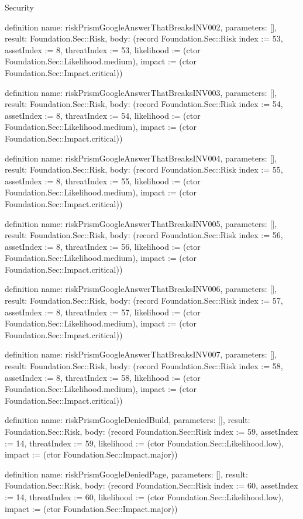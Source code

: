\begin{lexlean}{Security}
\begin{semanticmodule}
definition{
  name: riskPrismGoogleAnswerThatBreaksINV002,
  parameters: [],
  result: Foundation.Sec::Risk,
  body: (record Foundation.Sec::Risk {index := 53, assetIndex := 8, threatIndex := 53, likelihood := (ctor Foundation.Sec::Likelihood.medium), impact := (ctor Foundation.Sec::Impact.critical)})
}

definition{
  name: riskPrismGoogleAnswerThatBreaksINV003,
  parameters: [],
  result: Foundation.Sec::Risk,
  body: (record Foundation.Sec::Risk {index := 54, assetIndex := 8, threatIndex := 54, likelihood := (ctor Foundation.Sec::Likelihood.medium), impact := (ctor Foundation.Sec::Impact.critical)})
}

definition{
  name: riskPrismGoogleAnswerThatBreaksINV004,
  parameters: [],
  result: Foundation.Sec::Risk,
  body: (record Foundation.Sec::Risk {index := 55, assetIndex := 8, threatIndex := 55, likelihood := (ctor Foundation.Sec::Likelihood.medium), impact := (ctor Foundation.Sec::Impact.critical)})
}

definition{
  name: riskPrismGoogleAnswerThatBreaksINV005,
  parameters: [],
  result: Foundation.Sec::Risk,
  body: (record Foundation.Sec::Risk {index := 56, assetIndex := 8, threatIndex := 56, likelihood := (ctor Foundation.Sec::Likelihood.medium), impact := (ctor Foundation.Sec::Impact.critical)})
}

definition{
  name: riskPrismGoogleAnswerThatBreaksINV006,
  parameters: [],
  result: Foundation.Sec::Risk,
  body: (record Foundation.Sec::Risk {index := 57, assetIndex := 8, threatIndex := 57, likelihood := (ctor Foundation.Sec::Likelihood.medium), impact := (ctor Foundation.Sec::Impact.critical)})
}

definition{
  name: riskPrismGoogleAnswerThatBreaksINV007,
  parameters: [],
  result: Foundation.Sec::Risk,
  body: (record Foundation.Sec::Risk {index := 58, assetIndex := 8, threatIndex := 58, likelihood := (ctor Foundation.Sec::Likelihood.medium), impact := (ctor Foundation.Sec::Impact.critical)})
}

definition{
  name: riskPrismGoogleDeniedBuild,
  parameters: [],
  result: Foundation.Sec::Risk,
  body: (record Foundation.Sec::Risk {index := 59, assetIndex := 14, threatIndex := 59, likelihood := (ctor Foundation.Sec::Likelihood.low), impact := (ctor Foundation.Sec::Impact.major)})
}

definition{
  name: riskPrismGoogleDeniedPage,
  parameters: [],
  result: Foundation.Sec::Risk,
  body: (record Foundation.Sec::Risk {index := 60, assetIndex := 14, threatIndex := 60, likelihood := (ctor Foundation.Sec::Likelihood.low), impact := (ctor Foundation.Sec::Impact.major)})
}


\end{semanticmodule}
\end{lexlean}
